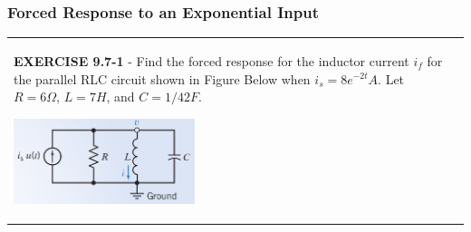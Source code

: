 \documentclass[aspectratio=169]{beamer}
\begin{document}
\begin{frame}[fragile]
	\frametitle{Forced Response to an Exponential Input}
\begin{tabular}{ll}
	\begin{columns}
		\begin{column}{1\textwidth}  %
		\textbf{EXERCISE 9.7-1} - Find the forced response for the inductor current $i_f$ for the parallel RLC
circuit shown in Figure Below when $i_s = 8e^{-2t} A$. Let $R = 6 \Omega$, $L = 7 H$, and
$C = 1/42 F$.
		
		
		\begin{center}
    			\includegraphics[height=2.5cm]{figure10.png}	
		\end{center}	
		\scalebox{0.8}{Answer: $i_f(t)=-12e^{-2t} \ A$ }
		\end{column}
	\end{columns}
\end{tabular}
\end{frame}
\end{document}
